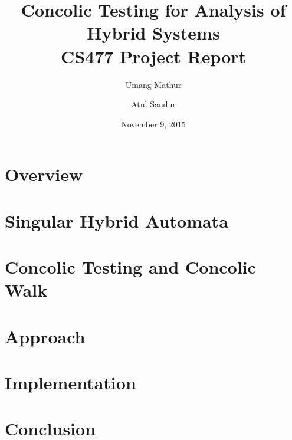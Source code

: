 \documentclass{article}
\title{Concolic Testing for Analysis of Hybrid Systems  \\
\large CS477 Project Report}
\author{Umang Mathur \and Atul Sandur}
\date{November 9, 2015}
\begin{document}
\maketitle

\section{Overview}
\label{sec:overview}


\section{Singular Hybrid Automata}
\label{sec:sha}


\section{Concolic Testing and Concolic Walk}
\label{sec:concolic}


\section{Approach}
\label{sec:approach}


\section{Implementation}
\label{sec:implementation}


%

\section{Conclusion}
\label{sec:conclusion}






\end{document}

